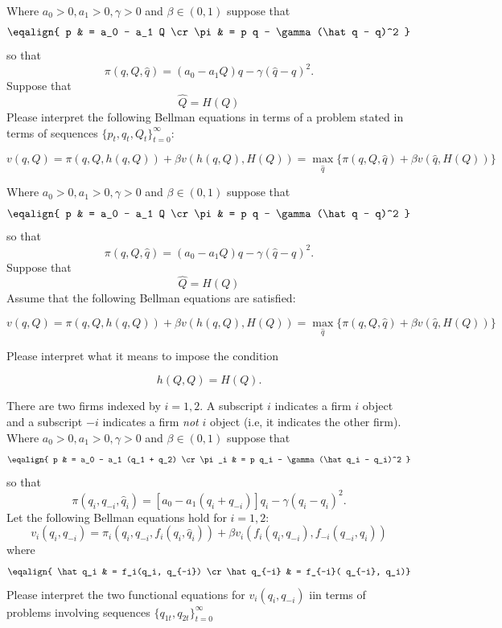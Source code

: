 \medskip
{} 
\medskip
\noindent Where $a_0 >0, a_1> 0, \gamma > 0$ and $\beta \in (0,1)$ suppose that
$$\eqalign{ p & = a_0 - a_1 Q \cr
           \pi &  = p q - \gamma(\hat q - q)^2 } $$
so that
$$ \pi(q, Q, \hat q) = (a_0 - a_1 Q) q - \gamma (\hat q - q)^2 .$$
Suppose that
$$ \hat Q  = H(Q)  $$
Please interpret the following Bellman equations in terms of a problem stated in terms of sequences  $\{p_t, q_t, Q_t\}_{t=0}^\infty$:

$$ v(q, Q) = \pi(q,Q, h(q, Q) ) + \beta v\left(h(q,Q), H(Q)\right) = \max_{\hat q} \{\pi(q, Q, \hat q) + \beta v(\hat q, H(Q) )   \} $$






\medskip
{} 
\medskip
\noindent  Where $a_0 >0, a_1> 0, \gamma > 0$ and $\beta \in (0,1)$ suppose that
$$\eqalign{ p & = a_0 - a_1 Q \cr
           \pi &  = p q - \gamma(\hat q - q)^2 } $$
so that
$$ \pi(q, Q, \hat q) = (a_0 - a_1 Q) q- \gamma (\hat q - q)^2 .$$
Suppose that
$$ \hat Q  = H(Q)  $$
Assume that the following Bellman equations are satisfied: %

$$ v(q, Q) = \pi(q,Q, h(q,Q)) + \beta v\left(h(q,Q), H(Q)\right) = \max_{\hat q} \{\pi(q, Q, \hat q) + \beta v(\hat q, H(Q) )   \} $$

\noindent Please interpret what it means to impose the condition

$$ h(Q, Q) = H(Q) .$$


\medskip
{} 
\medskip
\noindent  There are two firms indexed by $i = 1,2$.  A subscript $i$ indicates a  firm $i$ object  and a subscript $-i$ indicates
a firm {\it not\/} $i$ object (i.e, it indicates the other firm). Where $a_0 >0, a_1> 0, \gamma > 0$ and $\beta \in (0,1)$ suppose that
$$\eqalign{ p & = a_0 - a_1 (q_1 + q_2)  \cr
           \pi_i  &  = p q_i - \gamma(\hat q_i - q_i)^2 } $$
so that
$$ \pi(q_i, q_{-i}, \hat q_i) = [a_0 - a_1 (q_i + q_{-i}) ] q_i - \gamma (\hat q_i - q_i)^2 . $$
Let the following Bellman equations hold for $i=1,2$:
$$ v_i(q_i, q_{-i}) = \pi_i( q_i, q_{-i}, f_i(q_i, \hat q_i)) + \beta v_i(f_i(q_i, q_{-i}), f_{-i}(q_{-i}, q_i) )   $$
where
$$\eqalign{ \hat q_i & = f_i(q_i,  q_{-i}) \cr
                  \hat q_{-i} & = f_{-i}( q_{-i}, q_i)} $$
                  Please interpret the two functional equations for $ v_i(q_i, q_{-i})$ iin terms of problems  involving sequences $\{q_{1t}, q_{2t}\}_{t=0}^\infty$


